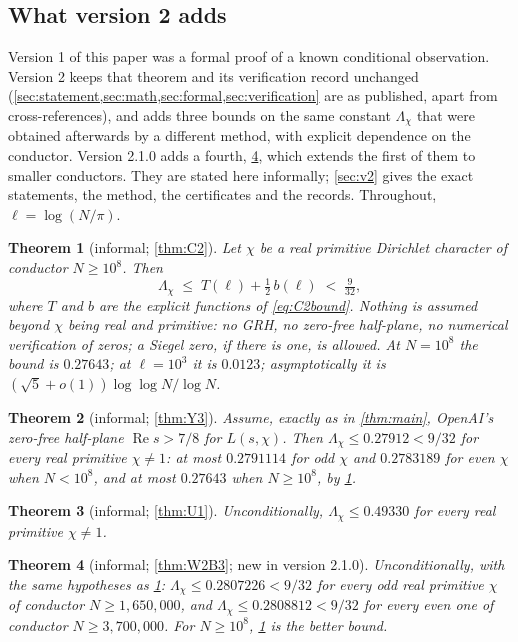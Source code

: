 \documentclass[11pt]{article}
\newtheorem{theorem}{Theorem}[section]
\theoremstyle{definition}
\newcommand{\re}{\operatorname{Re}}
\newcommand{\Lc}{\Lambda}
\begin{document}
\subsection{What version 2 adds}\label{sec:v2intro}

Version 1 of this paper was a formal proof of a known conditional observation. Version 2 keeps that theorem and its verification record unchanged (\cref{sec:statement,sec:math,sec:formal,sec:verification} are as published, apart from cross-references), and adds three bounds on the same constant $\Lc_\chi$ that were obtained afterwards by a different method, with explicit dependence on the conductor. Version 2.1.0 adds a fourth, \cref{thm:Dintro}, which extends the first of them to smaller conductors. They are stated here informally; \cref{sec:v2} gives the exact statements, the method, the certificates and the records. Throughout, $\ell = \log(N/\pi)$.

\begin{theorem}[informal; \cref{thm:C2}]\label{thm:Aintro}
Let $\chi$ be a real primitive Dirichlet character of conductor $N \ge 10^8$. Then
\[
\Lc_\chi \;\le\; T(\ell) + \tfrac12\,b(\ell) \;<\; \tfrac{9}{32},
\]
where $T$ and $b$ are the explicit functions of \eqref{eq:C2bound}. Nothing is assumed beyond $\chi$ being real and primitive: no GRH, no zero-free half-plane, no numerical verification of zeros; a Siegel zero, if there is one, is allowed. At $N = 10^8$ the bound is $0.27643$; at $\ell = 10^3$ it is $0.0123$; asymptotically it is $(\sqrt5 + o(1))\log\log N/\log N$.
\end{theorem}

\begin{theorem}[informal; \cref{thm:Y3}]\label{thm:Bintro}
Assume, exactly as in \cref{thm:main}, OpenAI's zero-free half-plane $\re s > 7/8$ for $L(s,\chi)$. Then $\Lc_\chi \le 0.27912 < 9/32$ for every real primitive $\chi \ne 1$: at most $0.2791114$ for odd $\chi$ and $0.2783189$ for even $\chi$ when $N < 10^8$, and at most $0.27643$ when $N \ge 10^8$, by \cref{thm:Aintro}.
\end{theorem}

\begin{theorem}[informal; \cref{thm:U1}]\label{thm:Cintro}
Unconditionally, $\Lc_\chi \le 0.49330$ for every real primitive $\chi \ne 1$.
\end{theorem}

\begin{theorem}[informal; \cref{thm:W2B3}; new in version 2.1.0]\label{thm:Dintro}
Unconditionally, with the same hypotheses as \cref{thm:Aintro}: $\Lc_\chi \le 0.2807226 < 9/32$ for every odd real primitive $\chi$ of conductor $N \ge 1{,}650{,}000$, and $\Lc_\chi \le 0.2808812 < 9/32$ for every even one of conductor $N \ge 3{,}700{,}000$. For $N \ge 10^8$, \cref{thm:Aintro} is the better bound.
\end{theorem}
\end{document}

